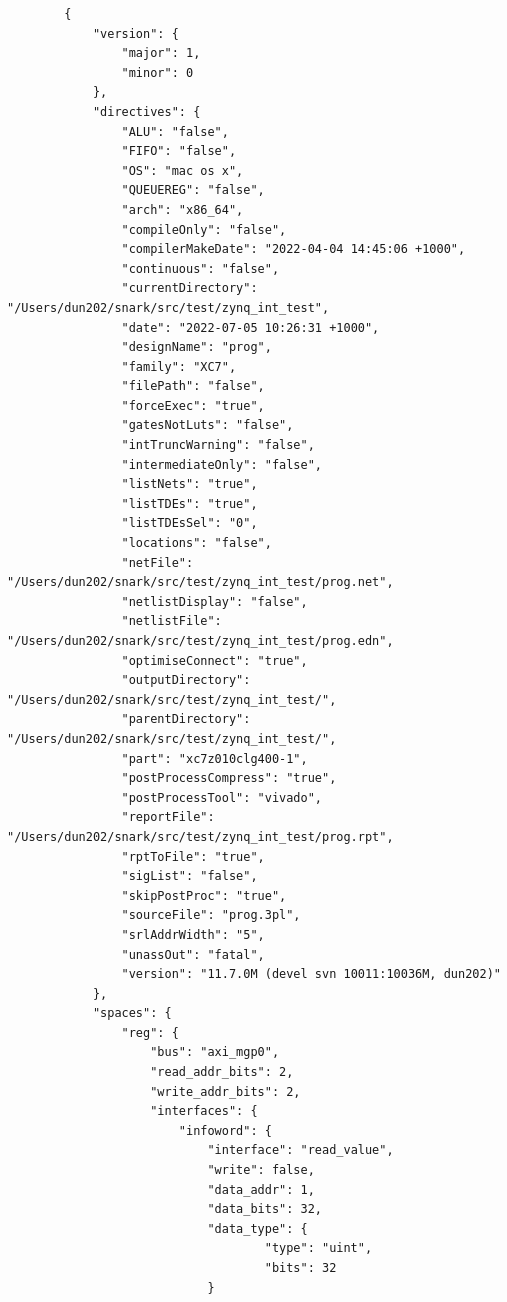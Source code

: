     \begin{verbatim}
        {
            "version": {
                "major": 1,
                "minor": 0
            },
            "directives": {
                "ALU": "false",
                "FIFO": "false",
                "OS": "mac os x",
                "QUEUEREG": "false",
                "arch": "x86_64",
                "compileOnly": "false",
                "compilerMakeDate": "2022-04-04 14:45:06 +1000",
                "continuous": "false",
                "currentDirectory": "/Users/dun202/snark/src/test/zynq_int_test",
                "date": "2022-07-05 10:26:31 +1000",
                "designName": "prog",
                "family": "XC7",
                "filePath": "false",
                "forceExec": "true",
                "gatesNotLuts": "false",
                "intTruncWarning": "false",
                "intermediateOnly": "false",
                "listNets": "true",
                "listTDEs": "true",
                "listTDEsSel": "0",
                "locations": "false",
                "netFile": "/Users/dun202/snark/src/test/zynq_int_test/prog.net",
                "netlistDisplay": "false",
                "netlistFile": "/Users/dun202/snark/src/test/zynq_int_test/prog.edn",
                "optimiseConnect": "true",
                "outputDirectory": "/Users/dun202/snark/src/test/zynq_int_test/",
                "parentDirectory": "/Users/dun202/snark/src/test/zynq_int_test/",
                "part": "xc7z010clg400-1",
                "postProcessCompress": "true",
                "postProcessTool": "vivado",
                "reportFile": "/Users/dun202/snark/src/test/zynq_int_test/prog.rpt",
                "rptToFile": "true",
                "sigList": "false",
                "skipPostProc": "true",
                "sourceFile": "prog.3pl",
                "srlAddrWidth": "5",
                "unassOut": "fatal",
                "version": "11.7.0M (devel svn 10011:10036M, dun202)"
            },
            "spaces": {
                "reg": {
                    "bus": "axi_mgp0",
                    "read_addr_bits": 2,
                    "write_addr_bits": 2,
                    "interfaces": {
                        "infoword": {
                            "interface": "read_value",
                            "write": false,
                            "data_addr": 1,
                            "data_bits": 32,
                            "data_type": {
                                    "type": "uint",
                                    "bits": 32
                            }

\end{verbatim}
